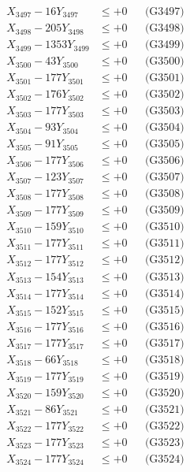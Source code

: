 \documentclass[a4paper,10pt]{article}
\begin{document}
{\begin{align}
X_{3497} - 16Y_{3497} &\leq +0 && \text{(G3497)} \\
X_{3498} - 205Y_{3498} &\leq +0 && \text{(G3498)} \\
X_{3499} - 1353Y_{3499} &\leq +0 && \text{(G3499)} \\
X_{3500} - 43Y_{3500} &\leq +0 && \text{(G3500)} \\
\allowbreak
X_{3501} - 177Y_{3501} &\leq +0 && \text{(G3501)} \\
X_{3502} - 176Y_{3502} &\leq +0 && \text{(G3502)} \\
X_{3503} - 177Y_{3503} &\leq +0 && \text{(G3503)} \\
X_{3504} - 93Y_{3504} &\leq +0 && \text{(G3504)} \\
X_{3505} - 91Y_{3505} &\leq +0 && \text{(G3505)} \\
X_{3506} - 177Y_{3506} &\leq +0 && \text{(G3506)} \\
X_{3507} - 123Y_{3507} &\leq +0 && \text{(G3507)} \\
X_{3508} - 177Y_{3508} &\leq +0 && \text{(G3508)} \\
X_{3509} - 177Y_{3509} &\leq +0 && \text{(G3509)} \\
X_{3510} - 159Y_{3510} &\leq +0 && \text{(G3510)} \\
\allowbreak
X_{3511} - 177Y_{3511} &\leq +0 && \text{(G3511)} \\
X_{3512} - 177Y_{3512} &\leq +0 && \text{(G3512)} \\
X_{3513} - 154Y_{3513} &\leq +0 && \text{(G3513)} \\
X_{3514} - 177Y_{3514} &\leq +0 && \text{(G3514)} \\
X_{3515} - 152Y_{3515} &\leq +0 && \text{(G3515)} \\
X_{3516} - 177Y_{3516} &\leq +0 && \text{(G3516)} \\
X_{3517} - 177Y_{3517} &\leq +0 && \text{(G3517)} \\
X_{3518} - 66Y_{3518} &\leq +0 && \text{(G3518)} \\
X_{3519} - 177Y_{3519} &\leq +0 && \text{(G3519)} \\
X_{3520} - 159Y_{3520} &\leq +0 && \text{(G3520)} \\
\allowbreak
X_{3521} - 86Y_{3521} &\leq +0 && \text{(G3521)} \\
X_{3522} - 177Y_{3522} &\leq +0 && \text{(G3522)} \\
X_{3523} - 177Y_{3523} &\leq +0 && \text{(G3523)} \\
X_{3524} - 177Y_{3524} &\leq +0 && \text{(G3524)} \\

\end{align}}
\end{document}
